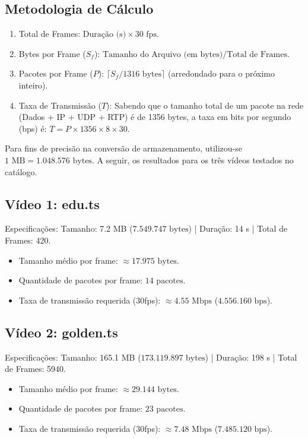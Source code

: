 \documentclass[12pt]{article}
\begin{document}
\subsection{Metodologia de Cálculo}
\begin{enumerate}
    \item {Total de Frames:} $\text{Duração (s)} \times 30\text{ fps}$.
    \item {Bytes por Frame ($S_f$):} $\text{Tamanho do Arquivo (em bytes)} / \text{Total de Frames}$.
    \item {Pacotes por Frame ($P$):} $\lceil S_f / 1316\text{ bytes} \rceil$ (arredondado para o próximo inteiro).
    \item {Taxa de Transmissão ($T$):} Sabendo que o tamanho total de um pacote na rede (Dados + IP + UDP + RTP) é de {1356 bytes}, a taxa em bits por segundo (bps) é: $T = P \times 1356 \times 8 \times 30$.
\end{enumerate}

Para fins de precisão na conversão de armazenamento, utilizou-se $1\text{ MB} = 1.048.576\text{ bytes}$. A seguir, os resultados para os três vídeos testados no catálogo.

\subsection{Vídeo 1: edu.ts}
{Especificações:} Tamanho: 7.2 MB ($7.549.747\text{ bytes}$) | Duração: 14 s | Total de Frames: 420.
\begin{itemize}
    \item {Tamanho médio por frame:} $\approx 17.975\text{ bytes}$.
    \item {Quantidade de pacotes por frame:} $14\text{ pacotes}$.
    \item {Taxa de transmissão requerida (30fps):} $\approx 4.55\text{ Mbps}$ ($4.556.160\text{ bps}$).
\end{itemize}

\subsection{Vídeo 2: golden.ts}
{Especificações:} Tamanho: 165.1 MB ($173.119.897\text{ bytes}$) | Duração: 198 s | Total de Frames: 5940.
\begin{itemize}
    \item {Tamanho médio por frame:} $\approx 29.144\text{ bytes}$.
    \item {Quantidade de pacotes por frame:} $23\text{ pacotes}$.
    \item {Taxa de transmissão requerida (30fps):} $\approx 7.48\text{ Mbps}$ ($7.485.120\text{ bps}$).
\end{itemize}
\end{document}
